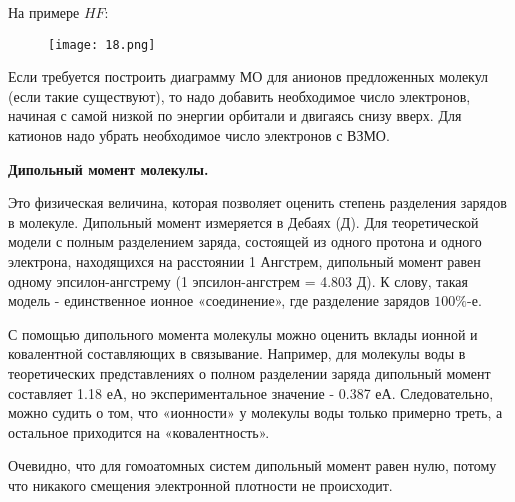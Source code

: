 	\par\smallskip
	
	На примере $HF$:
	
	
	\begin{figure}[H]
		\centering
		{\texttt{[image: 18.png]}}
	\end{figure}
	
	\par\smallskip
	
	Если требуется построить диаграмму МО для анионов
	предложенных молекул (если такие существуют), то надо добавить
	необходимое число электронов, начиная с самой низкой по энергии
	орбитали и двигаясь снизу вверх. Для катионов надо убрать
	необходимое число электронов с ВЗМО.
	
	\par\smallskip
	
	\begin{center}
\textbf{Дипольный момент молекулы.}			
	\end{center}

\par\smallskip
	
	Это физическая величина, которая позволяет оценить степень
	разделения зарядов в молекуле. Дипольный момент измеряется в
	Дебаях (Д). Для теоретической модели с полным разделением
	заряда, состоящей из одного протона и одного электрона,
	находящихся на расстоянии 1 Ангстрем, дипольный момент равен
	одному эпсилон-ангстрему (1 эпсилон-ангстрем = 4.803 Д). К слову,
	такая модель - единственное ионное «соединение», где разделение
	зарядов $100\%$-е.
	
	\par\smallskip
	
	С помощью дипольного момента молекулы можно оценить вклады
	ионной и ковалентной составляющих в связывание. Например, для
	молекулы воды в теоретических представлениях о полном
	разделении заряда дипольный момент составляет 1.18 еА, но
	экспериментальное значение - 0.387 еА. Следовательно, можно
	судить о том, что «ионности» у молекулы воды только примерно
	треть, а остальное приходится на «ковалентность».
	
	\par\smallskip
	
	Очевидно, что для гомоатомных систем дипольный момент равен
	нулю, потому что никакого смещения электронной плотности не
	происходит.


\par\bigskip
\par\bigskip
